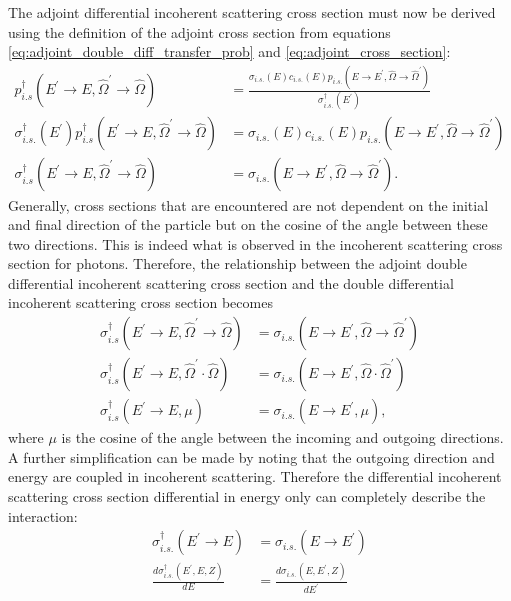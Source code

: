 The adjoint differential incoherent scattering cross section must now be 
derived using the definition of the adjoint cross section from equations
\ref{eq:adjoint_double_diff_transfer_prob} and \ref{eq:adjoint_cross_section}:
\begin{align}
  p_{i.s}^{\dagger}(E^{'} \to E, \hat{\Omega}^{'} \to \hat{\Omega}) & =
  \frac{\sigma_{i.s.}(E)c_{i.s.}(E)
    p_{i.s.}(E \to E^{'},\hat{\Omega} \to \hat{\Omega}^{'})}
  {\sigma_{i.s.}^{\dagger}(E^{'})} \nonumber \\
  \sigma_{i.s.}^{\dagger}(E^{'})
  p_{i.s}^{\dagger}(E^{'} \to E, \hat{\Omega}^{'} \to \hat{\Omega}) & = 
  \sigma_{i.s.}(E)c_{i.s.}(E)p_{i.s.}(E \to E^{'},\hat{\Omega} \to \hat{\Omega}^{'})
  \nonumber \\
  \sigma_{i.s}^{\dagger}(E^{'} \to E, \hat{\Omega}^{'} \to \hat{\Omega}) & = 
  \sigma_{i.s.}(E \to E^{'},\hat{\Omega} \to \hat{\Omega}^{'}).
\end{align}
Generally, cross sections that are encountered are not dependent on the 
initial and final direction of the particle but on the cosine of the angle
between these two directions. This is indeed what is observed in the incoherent 
scattering cross section for photons. Therefore, the relationship between the
adjoint double differential incoherent scattering cross section and the 
double differential incoherent scattering cross section becomes
\begin{align}
  \sigma_{i.s}^{\dagger}(E^{'} \to E, \hat{\Omega}^{'} \to \hat{\Omega}) & = 
  \sigma_{i.s.}(E \to E^{'},\hat{\Omega} \to \hat{\Omega}^{'}) \nonumber \\
  \sigma_{i.s}^{\dagger}(E^{'} \to E, \hat{\Omega}^{'} \cdot \hat{\Omega}) & = 
  \sigma_{i.s.}(E \to E^{'},\hat{\Omega} \cdot \hat{\Omega}^{'}) \nonumber \\
  \sigma_{i.s}^{\dagger}(E^{'} \to E, \mu) & = 
  \sigma_{i.s.}(E \to E^{'}, \mu),
\end{align}
where $\mu$ is the cosine of the angle between the incoming and outgoing 
directions. A further simplification can be made by noting that the outgoing
direction and energy are coupled in incoherent scattering. Therefore the 
differential incoherent scattering cross section differential in energy only
can completely describe the interaction:
\begin{align}
  \sigma_{i.s.}^{\dagger}(E^{'} \to E) & = \sigma_{i.s.}(E \to E^{'}) \nonumber \\
  \frac{d\sigma_{i.s.}^{\dagger}(E^{'},E,Z)}{dE} & = 
  \frac{d\sigma_{i.s.}(E,E^{'},Z)}{dE^{'}}
  \label{eq:adjoint_forward_cross_sec_rel}
\end{align}

